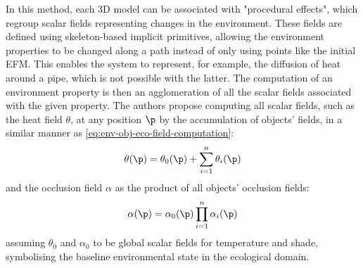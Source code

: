 In this method, each 3D model can be associated with "procedural effects", which regroup scalar fields representing changes in the environment. These fields are defined using skeleton-based implicit primitives, allowing the environment properties to be changed along a path instead of only using points like the initial EFM. This enables the system to represent, for example, the diffusion of heat around a pipe, which is not possible with the latter. The computation of an environment property is then an agglomeration of all the scalar fields associated with the given property. The authors propose computing all scalar fields, such as the heat field $\theta$, at any position $\p$ by the accumulation of objects' fields, in a similar manner as \cref{eq:env-obj-eco-field-computation}:
\begin{align}
\theta(\p) = \theta_0(\p) + \sum_{i=1}^{n}{ \theta_i(\p)}
\end{align}
and the occlusion field $\alpha$ as the product of all objects' occlusion fields:
\begin{align}
\alpha(\p) = \alpha_0(\p) \prod_{i=1}^{n}{\alpha_i(\p)}
\end{align}
assuming $\theta_0$ and $\alpha_0$ to be global scalar fields for temperature and shade, symbolising the baseline environmental state in the ecological domain.


